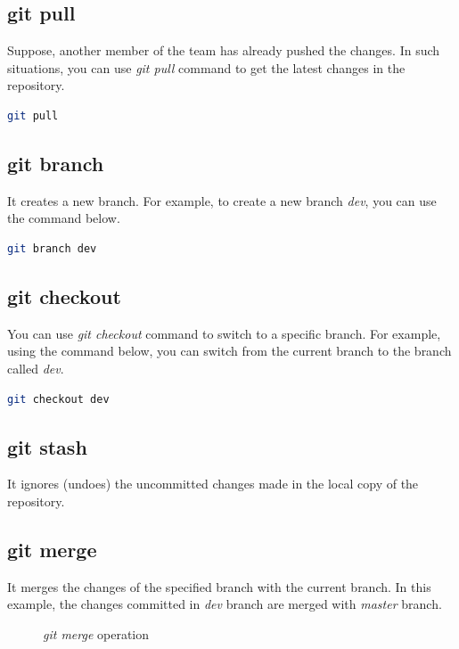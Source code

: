 \documentclass[letterpaper]{article}
\begin{document}
\subsection{git pull}
Suppose, another member of the team has already pushed the changes. In such situations, you can use \textit{git pull} command to get the latest changes in the repository. 

\begin{lstlisting}[language=Bash]
git pull
\end{lstlisting}

\subsection{git branch}
It creates a new branch. For example, to create a new branch \textit{dev}, you can use the command below. 

\begin{lstlisting}[language=Bash]
git branch dev
\end{lstlisting}

\subsection{git checkout}
You can use \textit{git checkout} command to switch to a specific branch. For example, using the command below, you can switch from the current branch to the branch called \textit{dev}.

\begin{lstlisting}[language=Bash]
git checkout dev
\end{lstlisting}

\subsection{git stash}
It ignores (undoes) the uncommitted changes made in the local copy of the repository.

\subsection{git merge}
It merges the changes of the specified branch with the current branch. In this example, the changes committed in \textit{dev} branch are merged with \textit{master} branch. 

\begin{figure}[h]
    \centering
    \caption{\textit{git merge} operation}
  \end{figure}
\end{document}
